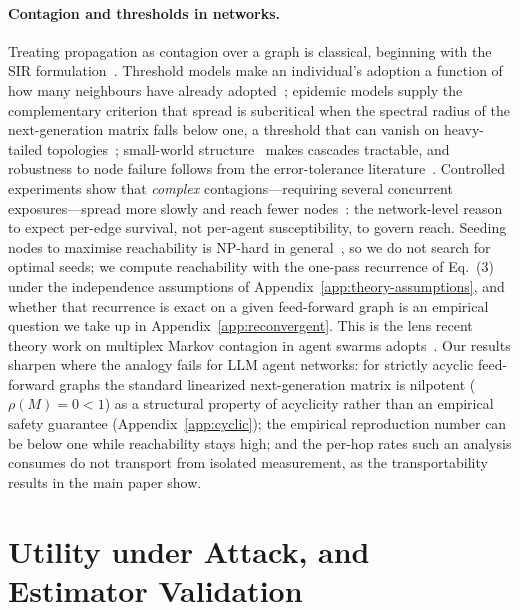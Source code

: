 \documentclass[sigconf,anonymous]{aamas}
\begin{document}
\paragraph{Contagion and thresholds in networks.} Treating propagation as contagion over
a graph is classical, beginning with the SIR formulation~\cite{KermackMcKendrick1927}.
Threshold models make an individual's adoption a function of how many neighbours have
already adopted~\cite{Granovetter1978,Watts2002}; epidemic models supply the
complementary criterion that spread is subcritical when the spectral radius of the
next-generation matrix falls below one, a threshold that can vanish on heavy-tailed
topologies~\cite{PastorSatorras2001,Newman2002,KeelingEames2005}; small-world
structure~\cite{WattsStrogatz1998} makes cascades tractable, and robustness to node
failure follows from the error-tolerance literature~\cite{Albert2000ErrorTolerance}.
Controlled experiments show that \emph{complex} contagions---requiring several
concurrent exposures---spread more slowly and reach fewer nodes~\cite{Centola2010}: the
network-level reason to expect per-edge survival, not per-agent susceptibility, to
govern reach. Seeding nodes to maximise reachability is NP-hard in
general~\cite{Kempe2003}, so we do not search for optimal seeds; we compute reachability
with the one-pass recurrence of Eq.~(3) under the independence assumptions of
Appendix~\ref{app:theory-assumptions}, and whether that recurrence is exact on a given
feed-forward graph is an empirical question we take up in
Appendix~\ref{app:reconvergent}. This is the lens recent theory work on multiplex Markov
contagion in agent swarms adopts~\cite{SwarmMarkov2026}. Our results sharpen where the
analogy fails for LLM agent networks: for strictly acyclic feed-forward graphs the
standard linearized next-generation matrix is nilpotent ($\rho(M) = 0 < 1$) as a
structural property of acyclicity rather than an empirical safety guarantee
(Appendix~\ref{app:cyclic}); the empirical reproduction number can be below one while
reachability stays high; and the per-hop rates such an analysis consumes do not
transport from isolated measurement, as the transportability results in the main paper
show.

\section{Utility under Attack, and Estimator Validation}
\label{app:utility}
\end{document}

